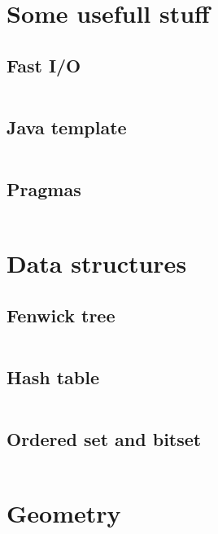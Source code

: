 \documentclass{article}
\begin{document}
\tableofcontents

\newpage

\section{Some usefull stuff}
\subsection{Fast I/O}
\inputminted[mathescape, breaklines, breakafter=(, tabsize=2, frame=lines, showtabs, tab=|\ , tabcolor=lightgray]{c++}{./basic/fast-io/io.cpp}
\subsection{Java template}
\inputminted[mathescape, breaklines, breakafter=(, tabsize=2, frame=lines, showtabs, tab=|\ , tabcolor=lightgray]{java}{./basic/java-template/Template.java}
\subsection{Pragmas}
\inputminted[mathescape, breaklines, breakafter=(, tabsize=2, frame=lines, showtabs, tab=|\ , tabcolor=lightgray]{c++}{./basic/pragmas/opt.cpp}
\section{Data structures}
\subsection{Fenwick tree}
\inputminted[mathescape, breaklines, breakafter=(, tabsize=2, frame=lines, showtabs, tab=|\ , tabcolor=lightgray]{c++}{./data-structures/fenwick/fenwick.cpp}
\subsection{Hash table}
\inputminted[mathescape, breaklines, breakafter=(, tabsize=2, frame=lines, showtabs, tab=|\ , tabcolor=lightgray]{c++}{./data-structures/hash-table/hash-table.cpp}
\subsection{Ordered set and bitset}
\inputminted[mathescape, breaklines, breakafter=(, tabsize=2, frame=lines, showtabs, tab=|\ , tabcolor=lightgray]{c++}{./data-structures/std/std.cpp}
\section{Geometry}
\end{document}
